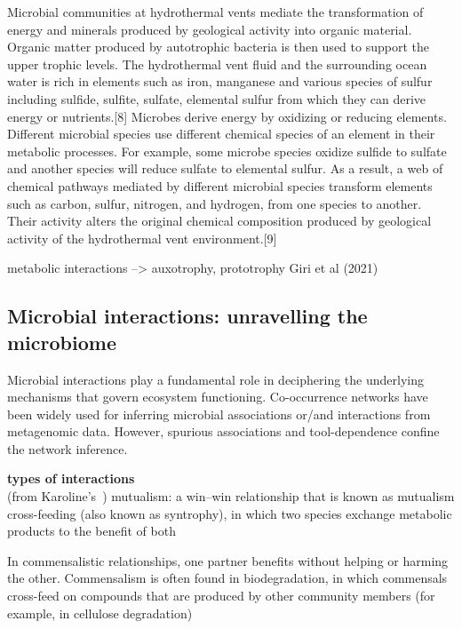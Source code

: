       Microbial communities at hydrothermal vents mediate the transformation of energy 
      and minerals produced by geological activity into organic material. 
      Organic matter produced by autotrophic bacteria is then used to support the upper trophic levels. 
      The hydrothermal vent fluid and the surrounding ocean water is rich in elements such as iron, 
      manganese and various species of sulfur including sulfide, sulfite, sulfate, elemental sulfur from 
      which they can derive energy or nutrients.[8] Microbes derive energy by oxidizing or reducing elements. 
      Different microbial species use different chemical species of an element in their metabolic processes. 
      For example, some microbe species oxidize sulfide to sulfate and another species will reduce sulfate to elemental sulfur. 
      As a result, a web of chemical pathways mediated by different microbial species transform elements such as 
      carbon, sulfur, nitrogen, and hydrogen, from one species to another. 
      Their activity alters the original chemical composition produced by geological activity of the hydrothermal vent environment.[9]


      metabolic interactions --> auxotrophy, prototrophy Giri et al (2021)




   \subsection{Microbial interactions: unravelling the microbiome}

      Microbial interactions play a fundamental role in deciphering the underlying mechanisms that govern ecosystem functioning. 
      Co-occurrence networks have been widely used for inferring microbial associations or/and interactions from metagenomic data. 
      However, spurious associations and tool-dependence confine the network inference. 


      \textbf{types of interactions} \\
      
      (from Karoline's~\cite{faust2012microbial})
      mutualism: a win–win relationship that is known as mutualism
      cross-feeding (also known as syntrophy), in which two species exchange metabolic products to the benefit of both

      In commensalistic relationships, one partner benefits without helping or harming the other. Commensalism is often found in biodegradation, in which commensals cross-feed on compounds that are produced by other community members (for example, in cellulose degradation)

